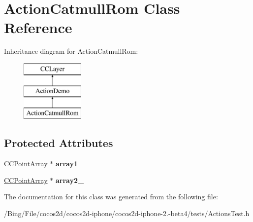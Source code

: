 \hypertarget{interface_action_catmull_rom}{\section{Action\-Catmull\-Rom Class Reference}
\label{interface_action_catmull_rom}
}
Inheritance diagram for Action\-Catmull\-Rom\-:\begin{figure}[H]
\begin{center}
\leavevmode
\includegraphics[height=3.000000cm]{interface_action_catmull_rom}
\end{center}
\end{figure}
\subsection*{Protected Attributes}
\begin{DoxyCompactItemize}
\item 
\hypertarget{interface_action_catmull_rom_aed502b951e4557cd42ac7c2ef71ab8c6}{\hyperlink{interface_c_c_point_array}{C\-C\-Point\-Array} $\ast$ {\bfseries array1\-\_\-}}\label{interface_action_catmull_rom_aed502b951e4557cd42ac7c2ef71ab8c6}

\item 
\hypertarget{interface_action_catmull_rom_a001085bf6fe2ce7ad7f6bb3182c130f8}{\hyperlink{interface_c_c_point_array}{C\-C\-Point\-Array} $\ast$ {\bfseries array2\-\_\-}}\label{interface_action_catmull_rom_a001085bf6fe2ce7ad7f6bb3182c130f8}

\end{DoxyCompactItemize}


The documentation for this class was generated from the following file\-:\begin{DoxyCompactItemize}
\item 
/\-Bing/\-File/cocos2d/cocos2d-\/iphone/cocos2d-\/iphone-\/2.-\/beta4/tests/Actions\-Test.\-h\end{DoxyCompactItemize}
